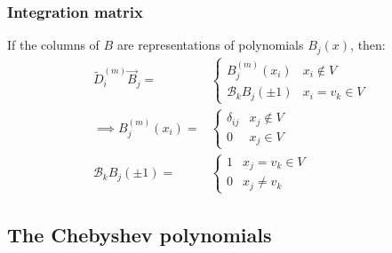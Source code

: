 \documentclass[handout]{beamer}
\begin{document}
\begin{frame}
\frametitle{Integration matrix}
If the columns of $B$ are representations of polynomials $B_j(x)$, then:
\begin{align*}
\tilde{D}^{(m)}_i \vec{B}_j = & \begin{cases} B^{(m)}_j(x_i) & x_i \notin V \\ \mathcal{B}_k B_j(\pm 1) & x_i = v_k \in V \end{cases} \\
 \implies B^{(m)}_j(x_i) = & \begin{cases} \delta_{ij} & x_j \notin V \\ 0 & x_j \in V \end{cases} \\
\mathcal{B}_k B_j(\pm 1) = & \begin{cases} 1 & x_j = v_k \in V \\ 0 & x_j \neq v_k \end{cases}
\end{align*}
\end{frame}

\subsection{The Chebyshev polynomials}
\end{document}
